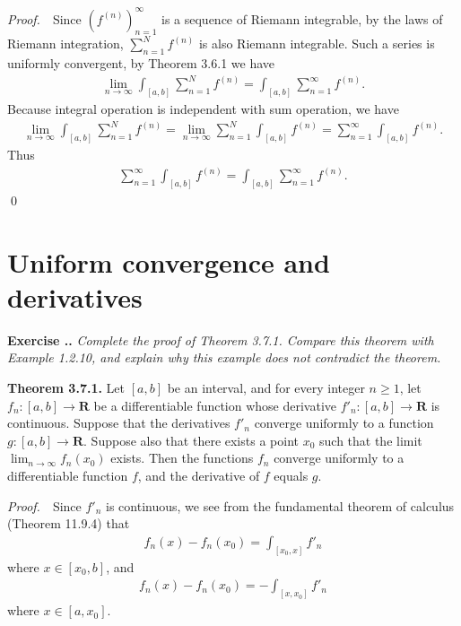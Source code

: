 \documentclass{book}
\newcommand{\pff}{\vspace{.25em}\noindent\emph{Proof.}~~}
\newcommand{\titl}[1]{\noindent\textbf{#1}}
\newcounter{Exercise}[section]
\renewcommand{\theExercise}{\thesection.\arabic{Exercise}.}
\newcommand{\new}{\vspace{1.5em}\noindent\textbf{Exercise \stepcounter{Exercise}\textbf{\theExercise}} }
\begin{document}
\pff Since $(f^{(n)})_{n = 1}^{\infty}$ is a sequence of Riemann integrable, by the laws of Riemann integration, $\sum_{n = 1}^{N} f^{(n)}$ is also Riemann integrable. Such a series is uniformly convergent, by Theorem 3.6.1 we have
    \begin{align*}
        \lim_{n \to \infty} \int_{[a, b]} \sum_{n = 1}^{N} f^{(n)} = \int_{[a, b]} \sum_{n = 1}^{\infty} f^{(n)}.
    \end{align*}
Because integral operation is independent with sum operation, we have
    \begin{align*}
        \lim_{n \to \infty} \int_{[a, b]} \sum_{n = 1}^{N} f^{(n)} = \lim_{n \to \infty} \sum_{n = 1}^{N} \int_{[a, b]} f^{(n)} = \sum_{n = 1}^{\infty} \int_{[a, b]} f^{(n)}.
    \end{align*}
Thus
    \begin{align*}
        \sum_{n = 1}^{\infty} \int_{[a, b]} f^{(n)} = \int_{[a, b]} \sum_{n = 1}^{\infty} f^{(n)}.
    \end{align*}
\qed

\section{Uniform convergence and derivatives}

\new\emph{Complete the proof of Theorem 3.7.1. Compare this theorem with Example 1.2.10, and explain why this example does not contradict the theorem.}

\begin{framed}
\titl{Theorem 3.7.1.} Let $[a, b]$ be an interval, and for every integer $n \geq 1$, let $f_n : [a, b] \to \mathbf{R}$ be a differentiable function whose derivative $f'_n : [a, b] \to \mathbf{R}$ is continuous. Suppose that the derivatives $f'_n$ converge uniformly to a function $g : [a, b] \to \mathbf{R}$. Suppose also that there exists a point $x_0$ such that the limit $\lim_{n \to \infty} f_n(x_0)$ exists. Then the functions $f_n$ converge uniformly to a differentiable function $f$, and the derivative of $f$ equals $g$.
\end{framed}

\pff Since $f'_n$ is continuous, we see from the fundamental theorem of calculus (Theorem 11.9.4) that
    \begin{align*}
        f_n(x) - f_n(x_0) = \int_{[x_0, x]} f'_n
    \end{align*}
where $x \in [x_0, b]$, and
    \begin{align*}
        f_n(x) - f_n(x_0) = - \int_{[x, x_0]} f'_n
    \end{align*}
where $x \in [a, x_0]$.
\end{document}
